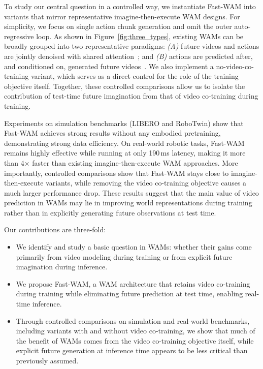 \documentclass{article}
\begin{document}
To study our central question in a controlled way, we instantiate Fast-WAM into variants that mirror representative imagine-then-execute WAM designs. For simplicity, we focus on single action chunk generation and omit the outer auto-regressive loop. As shown in Figure~\ref{fig:three_types}, existing WAMs can be broadly grouped into two representative paradigms: \emph{(A)} future videos and actions are jointly denoised with shared attention~\cite{ye2026worldactionmodelszeroshot, zhu2025unifiedworldmodelscoupling, bi2025motusunifiedlatentaction}; and \emph{(B)} actions are predicted after, and conditioned on, generated future videos~\cite{lingbot-va2026, feng2025vidarembodiedvideodiffusion, du2023learninguniversalpoliciestextguided}. We also implement a no-video-co-training variant, which serves as a direct control for the role of the training objective itself. Together, these controlled comparisons allow us to isolate the contribution of test-time future imagination from that of video co-training during training.

Experiments on simulation benchmarks (LIBERO and RoboTwin) show that Fast-WAM achieves strong results without any embodied pretraining, demonstrating strong data efficiency. On real-world robotic tasks, Fast-WAM remains highly effective while running at only 190\,ms latency, making it more than 4$\times$ faster than existing imagine-then-execute WAM approaches. More importantly, controlled comparisons show that Fast-WAM stays close to imagine-then-execute variants, while removing the video co-training objective causes a much larger performance drop. These results suggest that the main value of video prediction in WAMs may lie in improving world representations during training rather than in explicitly generating future observations at test time.

Our contributions are three-fold:
\begin{itemize}
    \item We identify and study a basic question in WAMs: whether their gains come primarily from video modeling during training or from explicit future imagination during inference.
    \item We propose Fast-WAM, a WAM architecture that retains video co-training during training while eliminating future prediction at test time, enabling real-time inference.
    \item Through controlled comparisons on simulation and real-world benchmarks, including variants with and without video co-training, we show that much of the benefit of WAMs comes from the video co-training objective itself, while explicit future generation at inference time appears to be less critical than previously assumed.
\end{itemize}
\end{document}
